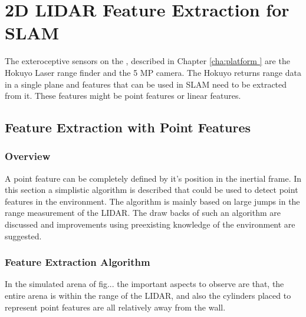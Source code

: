 \chapter{2D LIDAR Feature Extraction for SLAM}
\label{cha:featureExtractor}

The exteroceptive sensors on the \imp, described in Chapter \ref{cha:platform } are the Hokuyo Laser range finder and the 5 MP camera. The Hokuyo returns range data in a single plane and features that can be used in SLAM need to be extracted from it. These features might be point features or linear features. 

\section{Feature Extraction with Point Features}
\label{sec:spike}
\subsection{Overview}
A point feature can be completely defined by it's position in the inertial frame. In this section a simplistic algorithm is described that could be used to detect point features in the environment. The algorithm is mainly based on large jumps in the range measurement of the LIDAR. The draw backs of such an algorithm are discussed and improvements using preexisting knowledge of the environment are suggested.

\subsection{Feature Extraction Algorithm}
\label{sec: spikeAlgo}

In the simulated arena of fig... the important aspects to observe are that, the entire arena is within the range of the LIDAR, and also the cylinders placed to represent point features are all relatively away from the wall. 